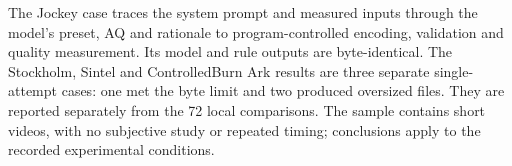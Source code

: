 \documentclass[10pt,a4paper]{article}
\begin{document}
The Jockey case traces the system prompt and measured inputs through the model's preset, AQ and rationale to program-controlled encoding, validation and quality measurement. Its model and rule outputs are byte-identical. The Stockholm, Sintel and ControlledBurn Ark results are three separate single-attempt cases: one met the byte limit and two produced oversized files. They are reported separately from the 72 local comparisons. The sample contains short videos, with no subjective study or repeated timing; conclusions apply to the recorded experimental conditions.
\end{document}
